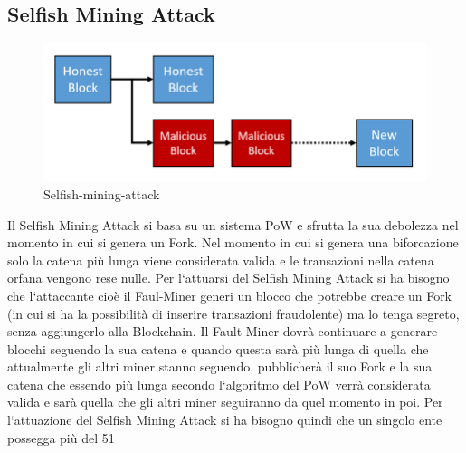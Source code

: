 \documentclass[12pt]{report}
\begin{document}
\subsection{Selfish Mining Attack}
\begin{figure}[h]
	\includegraphics[width=\textwidth]{Selfish-mining-attack}
	\centering
	\caption{Selfish-mining-attack}
	\label{fig:SM-attack}
\end{figure}
Il Selfish Mining Attack si basa su un sistema PoW e sfrutta la sua debolezza nel momento in cui si genera un Fork. Nel momento in cui si genera una biforcazione solo la catena più lunga viene considerata valida e le transazioni nella catena orfana vengono rese nulle. Per l`attuarsi del Selfish Mining Attack si ha bisogno che l`attaccante cioè il Faul-Miner generi un blocco che potrebbe creare un Fork (in cui si ha la possibilità di inserire transazioni fraudolente) ma lo tenga segreto, senza aggiungerlo alla Blockchain. Il Fault-Miner dovrà continuare a generare blocchi seguendo la sua catena e quando questa sarà più lunga di quella che attualmente gli altri miner stanno seguendo, pubblicherà il suo Fork e la sua catena che essendo più lunga secondo l`algoritmo del PoW verrà considerata valida e sarà quella che gli altri miner seguiranno da quel momento in poi. Per l`attuazione del Selfish Mining Attack si ha bisogno quindi che un singolo ente possegga più del 51%
\end{document}
